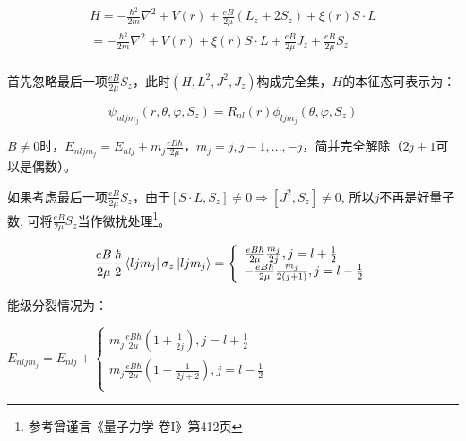 
\begin{equation}\label{30-8}
\begin{array}{l}
 H =  - \frac{{\hbar {}^2}}{{2m}}\nabla ^2  + V\left( r \right) + \frac{{eB}}{{2\mu }}\left( {L_z  + 2S_z } \right) + \xi \left( r \right)S \cdot L \\
  =  - \frac{{\hbar {}^2}}{{2m}}\nabla ^2  + V\left( r \right) + \xi \left( r \right)S \cdot L + \frac{{eB}}{{2\mu }}J_z  + \frac{{eB}}{{2\mu }}S_z  \\
 \end{array}
\end{equation}

首先忽略最后一项$\frac{{eB}}{{2\mu }}S_z $，此时$\left( {H,L^2 ,J^2 ,J_z } \right)$构成完全集，$H$的本征态可表示为：

\begin{equation}\label{30-9}
\psi _{nljm_j } \left( {r,\theta ,\varphi ,S_z } \right) = R_{nl} \left( r \right)\phi _{ljm_j } \left( {\theta ,\varphi ,S_z } \right)
\end{equation}

$B \ne 0$时，$E_{nljm_j }  = E_{nlj}  + m_j \frac{{eB\hbar }}{{2\mu }}$，$m_j  = j,j - 1,..., - j$，简并完全解除（$2j+1$可以是偶数）。


如果考虑最后一项$\frac{{eB}}{{2\mu }}S_z $，由于$\left[ {S \cdot
L,S_z } \right] \ne 0$$ \Rightarrow \left[ {J^2 ,S_z } \right] \ne
0$, 所以$j$不再是好量子数, 可将$\frac{{eB}}{{2\mu }}S_z
$当作微扰处理\footnote{参考曾谨言《量子力学 卷I》第412页}。


\begin{equation}\label{30-10}
\frac{{eB}}{{2\mu }}\frac{\hbar }{2}\left\langle {ljm_j } \right|\sigma _z \left| {ljm_j } \right\rangle  = \left\{ \begin{array}{l}
 \frac{{eB\hbar }}{{2\mu }}\frac{{m_j }}{{2j}},j = l + {\textstyle{1 \over 2}} \\
  - \frac{{eB\hbar }}{{2\mu }}\frac{{m_j }}{{2\left( {j + 1} \right)}},j = l - {\textstyle{1 \over 2}} \\
 \end{array} \right.
\end{equation}

能级分裂情况为：

$E_{nljm_j }  = E_{nlj}  + \left\{ \begin{array}{l}
 m_j \frac{{eB\hbar }}{{2\mu }}\left( {1 + \frac{1}{{2j}}} \right),j = l + \frac{1}{2} \\
 m_j \frac{{eB\hbar }}{{2\mu }}\left( {1 - \frac{1}{{2j + 2}}} \right),j = l - \frac{1}{2} \\
 \end{array} \right.$

